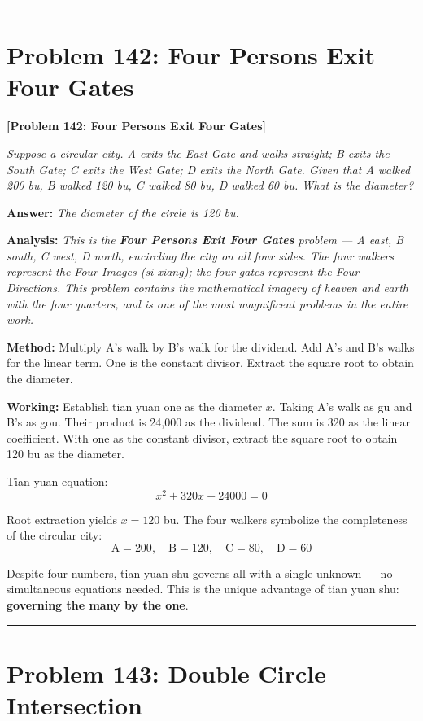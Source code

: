 \documentclass[11pt,a4paper]{book}
\newcommand{\answer}[1]{\noindent\textbf{\color{anacolor}Answer: }\textit{#1}\par}
\newcommand{\method}[1]{\noindent\textbf{\color{methodcolor}Method: }#1\par}
\newcommand{\working}[1]{\noindent\textbf{\color{workcolor}Working: }#1\par}
\newcommand{\analysis}[1]{\noindent\textbf{\color{anacolor}Analysis: }\textit{#1}\par}
\newcommand{\shortline}{\noindent\rule{0.5\textwidth}{0.4pt}\par}
\begin{document}
\shortline

\section{Problem 142: Four Persons Exit Four Gates}
\label{sec:prob142}

\noindent\textbf{\color{probcolor}[Problem 142: Four Persons Exit Four Gates]}

\textit{Suppose a circular city. A exits the East Gate and walks straight; B exits the South Gate; C exits the West Gate; D exits the North Gate. Given that A walked 200 bu, B walked 120 bu, C walked 80 bu, D walked 60 bu. What is the diameter?}

\answer{The diameter of the circle is 120 bu.}

\analysis{This is the \textbf{Four Persons Exit Four Gates} problem --- A east, B south, C west, D north, encircling the city on all four sides. The four walkers represent the Four Images (\textit{si xiang}); the four gates represent the Four Directions. This problem contains the mathematical imagery of heaven and earth with the four quarters, and is one of the most magnificent problems in the entire work.}

\method{Multiply A's walk by B's walk for the dividend. Add A's and B's walks for the linear term. One is the constant divisor. Extract the square root to obtain the diameter.}

\working{Establish tian yuan one as the diameter $x$. Taking A's walk as gu and B's as gou. Their product is 24,000 as the dividend. The sum is 320 as the linear coefficient. With one as the constant divisor, extract the square root to obtain 120 bu as the diameter.

Tian yuan equation:
$$x^2 + 320x - 24000 = 0$$

Root extraction yields $x = 120$ bu. The four walkers symbolize the completeness of the circular city:
$$\text{A} = 200, \quad \text{B} = 120, \quad \text{C} = 80, \quad \text{D} = 60$$

Despite four numbers, tian yuan shu governs all with a single unknown --- no simultaneous equations needed. This is the unique advantage of tian yuan shu: \textbf{governing the many by the one}.}

\shortline

\section{Problem 143: Double Circle Intersection}
\label{sec:prob143}
\end{document}
